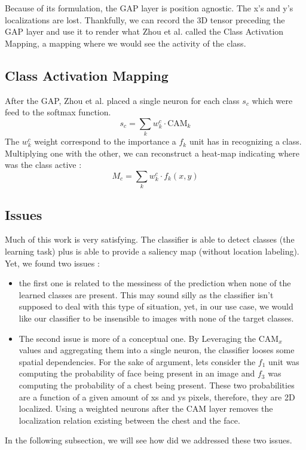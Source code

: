 			Because of its formulation, the GAP layer is position agnostic. The x's and y's localizations are lost. Thankfully, we can record the 3D tensor preceding the GAP layer and use it to render what Zhou et al. called the Class Activation Mapping, a mapping where we would see the activity of the class.

		\subsection{Class Activation Mapping}
		\label{sub:class_activation_mapping}
			After the GAP, Zhou et al. placed a single neuron for each class $s_c$ which were feed to the softmax function. 
			\begin{equation}
				s_c = \sum_k w_k^c \cdot \text{CAM}_k
			\end{equation}
			The $w_k^c$ weight correspond to the importance a $f_k$ unit has in recognizing a class. Multiplying one with the other, we can reconstruct a heat-map indicating where was the class active :
			\begin{equation}
				M_c = \sum_k w_k^c \cdot f_k(x,y)
			\end{equation}

		\subsection{Issues}
		\label{sub:issues}
			Much of this work is very satisfying. The classifier is able to detect classes (the learning task) plus is able to provide a saliency map (without location labeling). Yet, we found two issues : 
			\begin{itemize}
				\item the first one is related to the messiness of the prediction when none of the learned classes are present. This may sound silly as the classifier isn't supposed to deal with this type of situation, yet, in our use case, we would like our classifier to be insensible to images with none of the target classes. 
				\item The second issue is more of a conceptual one. By Leveraging the $\text{CAM}_x$ values and aggregating them into a single neuron, the classifier looses some spatial dependencies. 
				For the sake of argument, lets consider the $f_1$ unit was computing the probability of face being present in an image and $f_3$ was computing the probability of a chest being present. These two probabilities are a function of a given amount of xs and ys pixels, therefore, they are 2D localized. Using a weighted neurons after the CAM layer removes the localization relation existing between the chest and the face.
			\end{itemize}
			In the following subsection, we will see how did we addressed these two issues.

